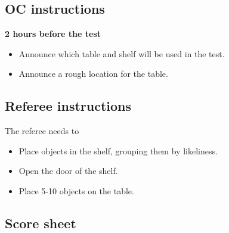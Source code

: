 \newpage
\subsection{OC instructions}

\textbf{2 hours before the test}
\begin{itemize}
	\item Announce which table and shelf will be used in the test.
	\item Announce a rough location for the table.
\end{itemize}

\subsection{Referee instructions}
The referee needs to
\begin{itemize}
	\item Place objects in the shelf, grouping them by likeliness.
	\item Open the door of the shelf.
	\item Place 5-10 objects on the table.
\end{itemize}


\newpage
\subsection{Score sheet}



